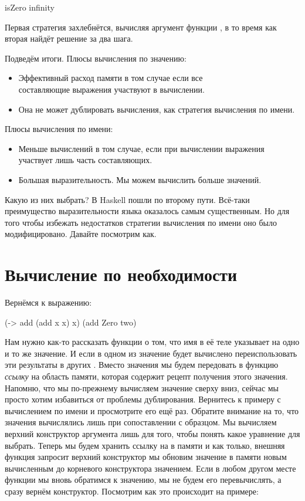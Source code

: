 \begin{code}
isZero infinity
\end{code}

Первая стратегия захлебнётся, вычисляя аргумент функции , в
то время как вторая найдёт решение за два шага.

Подведём итоги. Плюсы вычисления по значению:

\begin{itemize}
\item
  Эффективный расход памяти в том случае если все\\ составляющие
  выражения участвуют в вычислении.
\item
  Она не может дублировать вычисления, как стратегия вычисления по
  имени.
\end{itemize}

Плюсы вычисления по имени:

\begin{itemize}
\item
  Меньше вычислений в том случае, если при вычислении выражения\\
  участвует лишь часть составляющих.
\item
  Большая выразительность. Мы можем вычислить больше значений.
\end{itemize}

Какую из них выбрать? В Haskell пошли по второму пути. Всё-таки
преимущество выразительности языка оказалось самым существенным. Но для
того чтобы избежать недостатков стратегии вычисления по имени оно было
модифицировано. Давайте посмотрим как.

\section{Вычисление по необходимости}

 
Вернёмся к выражению:


\begin{code}
(\x -> add (add x x) x) (add Zero two)
\end{code}

Нам нужно как-то рассказать функции о том, что имя  в её теле
указывает на одно и то же значение. И если в одном из  значение
будет вычислено переиспользовать эти результаты в других . Вместо
значения мы будем передовать в функцию \emph{ссылку} на область памяти,
которая содержит рецепт получения этого значения. Напомню, что мы
по-прежнему вычисляем значение сверху вниз, сейчас мы просто хотим
избавиться от проблемы дублирования. Вернитесь к примеру с вычислением
по имени и просмотрите его ещё раз. Обратите внимание на то, что
значения вычислялись лишь при сопоставлении с образцом. Мы вычисляем
верхний конструктор аргумента лишь для того, чтобы понять какое
уравнение для  выбрать. Теперь мы будем хранить ссылку на
 в памяти и как только, внешняя функция запросит
верхний конструктор мы обновим значение в памяти новым вычисленным до
корневого конструктора значением. Если в любом другом месте функции мы
вновь обратимся к значению, мы не будем его перевычислять, а сразу
вернём конструктор. Посмотрим как это происходит на примере:


